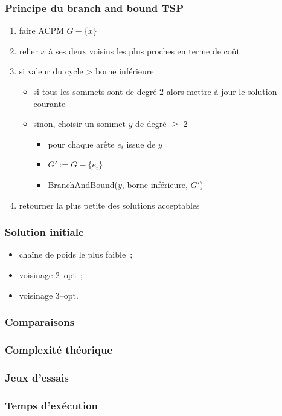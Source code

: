 \documentclass[french]{beamer}
\begin{document}
\begin{frame}
\frametitle{Principe du branch and bound TSP}
\begin{enumerate}
 \item faire ACPM $G - \{x \}$
  \item relier $x$ à ses deux voisins les plus proches en terme de coût
  \item si {valeur du cycle > borne inférieure}
   \begin{itemize}
\item si {tous les sommets sont de degré $2$} alors mettre à jour le solution courante
\item sinon, choisir un sommet $y$ de degré $\geq$ 2
\begin{itemize}
\item  pour {chaque arête $e_i$ issue de $y$}
\item  $G' := G - \{ e_i \}$
\item BranchAndBound($y$, borne inférieure, $G'$)
\end{itemize}
\end{itemize}
    \item retourner la plus petite des solutions acceptables
\end{enumerate}

\end{frame}

\begin{frame}
  \frametitle{Solution initiale}
  \begin{itemize}
  \item chaîne de poids le plus faible~;
  \item voisinage 2--opt~;
  \item voisinage 3--opt.
  \end{itemize}
\end{frame}


\begin{frame}
  \frametitle{Comparaisons}
\end{frame}

\begin{frame}
  \frametitle{Complexité théorique}
\end{frame}

\begin{frame}
  \frametitle{Jeux d'essais}
\end{frame}

\begin{frame}
  \frametitle{Temps d'exécution}
\end{frame}
\end{document}
